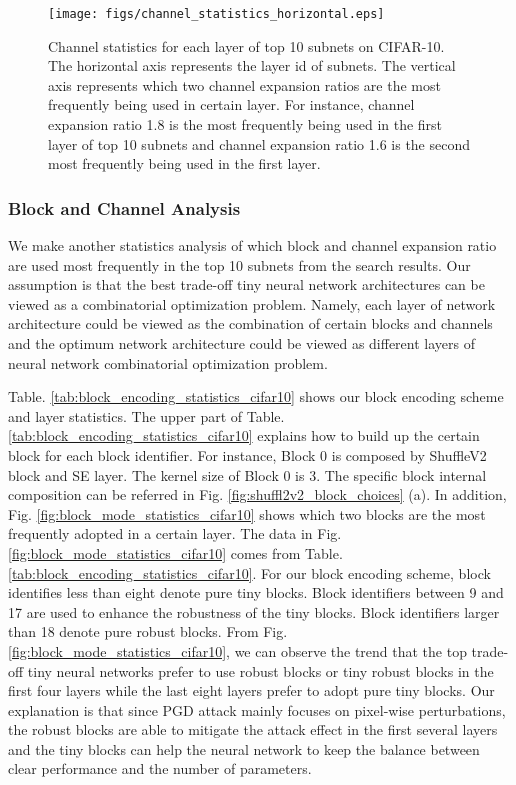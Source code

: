 \documentclass[journal]{IEEEtran}
\begin{document}
\begin{figure*}[htb]
    \centering
    \texttt{[image: figs/channel\_statistics\_horizontal.eps]}
    \caption{Channel statistics for each layer of top 10 subnets on CIFAR-10. The horizontal axis represents the layer id of subnets. The vertical axis represents which two channel expansion ratios are the most frequently being used in certain layer. For instance, channel expansion ratio 1.8 is the most frequently being used in the first layer of top 10 subnets and channel expansion ratio 1.6 is the second most frequently being used in the first layer.}
    \label{fig:channel_mode_statistics_cifar10}
\end{figure*}

\subsubsection{\textbf{Block and Channel Analysis}}
We make another statistics analysis of which block and channel expansion ratio are used most frequently in the top 10 subnets from the search results. Our assumption is that the best trade-off tiny neural network architectures can be viewed as a combinatorial optimization problem. Namely, each layer of network architecture could be viewed as the combination of certain blocks and channels and the optimum network architecture could be viewed as different layers of neural network combinatorial optimization problem.

Table. \ref{tab:block_encoding_statistics_cifar10} shows our block encoding scheme and layer statistics. The upper part of Table. \ref{tab:block_encoding_statistics_cifar10} explains how to build up the certain block for each block identifier. For instance, Block 0 is composed by ShuffleV2 block and SE layer. The kernel size of Block 0 is 3. The specific block internal composition can be referred in Fig. \ref{fig:shuffl2v2_block_choices} (a). In addition, Fig. \ref{fig:block_mode_statistics_cifar10} shows which two blocks are the most frequently adopted in a certain layer. The data in Fig. \ref{fig:block_mode_statistics_cifar10} comes from Table. \ref{tab:block_encoding_statistics_cifar10}. For our block encoding scheme, block identifies less than eight denote pure tiny blocks. Block identifiers between 9 and 17 are used to enhance the robustness of the tiny blocks. Block identifiers larger than 18 denote pure robust blocks. From Fig. \ref{fig:block_mode_statistics_cifar10}, we can observe the trend that the top trade-off tiny neural networks prefer to use robust blocks or tiny robust blocks in the first four layers while the last eight layers prefer to adopt pure tiny blocks. Our explanation is that since PGD attack mainly focuses on pixel-wise perturbations, the robust blocks are able to mitigate the attack effect in the first several layers and the tiny blocks can help the neural network to keep the balance between clear performance and the number of parameters. 
\end{document}
